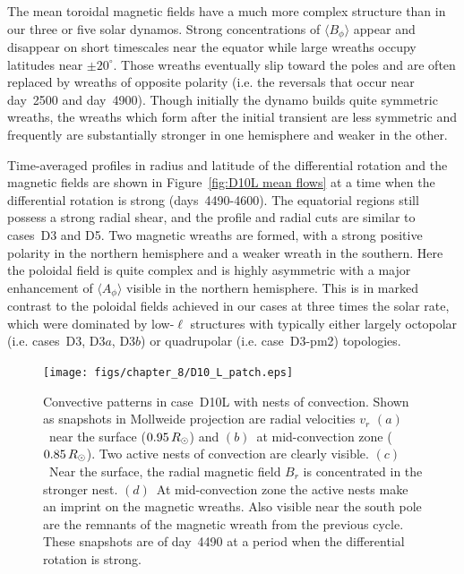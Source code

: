 The mean toroidal magnetic fields have a much more complex structure
than in our three or five solar dynamos.  Strong concentrations of $\langle
B_\phi \rangle$ appear and disappear on short timescales near the
equator while large wreaths occupy latitudes near $\pm 20^\circ$.
Those wreaths eventually slip toward the poles and are often replaced
by wreaths of opposite polarity (i.e. the reversals that occur near
day~2500 and day~4900).  Though initially the dynamo builds quite
symmetric wreaths, the wreaths which form after the initial transient
are less symmetric and frequently are substantially stronger in one
hemisphere and weaker in the other.

Time-averaged profiles in radius and latitude of the differential
rotation and the magnetic fields are shown in Figure~\ref{fig:D10L
mean flows} at a time when the differential rotation is strong
(days~4490-4600).  The equatorial regions still possess a strong radial
shear, and the profile and radial cuts are similar to cases~D3 and
D5.  Two magnetic wreaths are formed, with a strong positive polarity
in the northern hemisphere and a weaker wreath in the southern.  Here
the poloidal field is quite complex and is highly asymmetric with
a major enhancement of $\langle A_\phi \rangle$ visible in the
northern hemisphere.  This is in marked contrast to the poloidal
fields achieved in our cases at three times the solar rate, which were
dominated by low-$\ell$ structures with typically either
largely octopolar (i.e. cases~D3, D3$a$, D3$b$) or quadrupolar
(i.e. case~D3-pm2) topologies. 


\begin{figure}[!t]
  \texttt{[image: figs/chapter\_8/D10\_L\_patch.eps]}
  \caption[Convective patterns in case~D10L with nests of convection]
          {Convective patterns in case~D10L with nests of convection.
            Shown as snapshots in Mollweide projection are radial
            velocities $v_r$ $(a)$~near the surface ($0.95\thinspace
            R_\odot$) and $(b)$~at mid-convection zone
            ($0.85\thinspace R_\odot$).  Two active nests of
            convection are clearly visible.  $(c)$~Near the surface,
            the radial magnetic field $B_r$ is concentrated in the
            stronger nest.  $(d)$~At mid-convection zone the active
            nests make an imprint on the magnetic wreaths. 
            Also visible near the south pole are the 
            remnants of the magnetic wreath from the previous cycle.
            These snapshots are of day~4490 at a period when the
            differential rotation is strong. 
            \label{fig:D10L convection}}
\end{figure}

